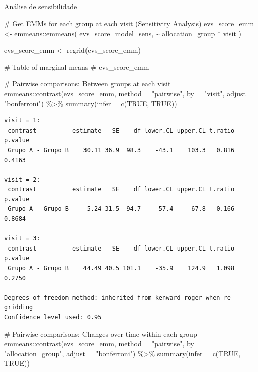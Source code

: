 \documentclass[
  12pt,
]{article}
\makeatletter
\let\oldsubparagraph\subparagraph
\renewcommand{\subparagraph}{
    \@ifstar
      \xxxSubParagraphStar
      \xxxSubParagraphNoStar
  }
\newcommand{\xxxSubParagraphStar}[1]{\oldsubparagraph*{#1}\mbox{}}
\newcommand{\xxxSubParagraphNoStar}[1]{\oldsubparagraph{#1}\mbox{}}
\newenvironment{Shaded}{\begin{snugshade}}{\end{snugshade}}
\newcommand{\AttributeTok}[1]{\textcolor[rgb]{0.40,0.45,0.13}{#1}}
\newcommand{\CommentTok}[1]{\textcolor[rgb]{0.37,0.37,0.37}{#1}}
\newcommand{\ConstantTok}[1]{\textcolor[rgb]{0.56,0.35,0.01}{#1}}
\newcommand{\FunctionTok}[1]{\textcolor[rgb]{0.28,0.35,0.67}{#1}}
\newcommand{\NormalTok}[1]{\textcolor[rgb]{0.00,0.23,0.31}{#1}}
\newcommand{\OtherTok}[1]{\textcolor[rgb]{0.00,0.23,0.31}{#1}}
\newcommand{\SpecialCharTok}[1]{\textcolor[rgb]{0.37,0.37,0.37}{#1}}
\newcommand{\StringTok}[1]{\textcolor[rgb]{0.13,0.47,0.30}{#1}}
\makeatother
\begin{document}
\subparagraph{Análise de
sensibilidade}\label{anuxe1lise-de-sensibilidade-16}

\begin{Shaded}
\begin{Highlighting}[]
\CommentTok{\# Get EMMs for each group at each visit (Sensitivity Analysis)}
\NormalTok{evs\_score\_emm }\OtherTok{\textless{}{-}}\NormalTok{ emmeans}\SpecialCharTok{::}\FunctionTok{emmeans}\NormalTok{(}
\NormalTok{    evs\_score\_model\_sens, }
    \SpecialCharTok{\textasciitilde{}}\NormalTok{ allocation\_group }\SpecialCharTok{*}\NormalTok{ visit}
\NormalTok{)}

\NormalTok{evs\_score\_emm }\OtherTok{\textless{}{-}} \FunctionTok{regrid}\NormalTok{(evs\_score\_emm)}

\CommentTok{\# Table of marginal means}
\CommentTok{\# evs\_score\_emm}

\CommentTok{\# Pairwise comparisons: Between groups at each visit}
\NormalTok{emmeans}\SpecialCharTok{::}\FunctionTok{contrast}\NormalTok{(evs\_score\_emm,}
\AttributeTok{method =} \StringTok{"pairwise"}\NormalTok{, }\AttributeTok{by =} \StringTok{"visit"}\NormalTok{,}
\AttributeTok{adjust =} \StringTok{"bonferroni"}\NormalTok{) }\SpecialCharTok{\%\textgreater{}\%} \FunctionTok{summary}\NormalTok{(}\AttributeTok{infer =} \FunctionTok{c}\NormalTok{(}\ConstantTok{TRUE}\NormalTok{, }\ConstantTok{TRUE}\NormalTok{))}
\end{Highlighting}
\end{Shaded}

\begin{verbatim}
visit = 1:
 contrast          estimate   SE    df lower.CL upper.CL t.ratio p.value
 Grupo A - Grupo B    30.11 36.9  98.3    -43.1    103.3   0.816  0.4163

visit = 2:
 contrast          estimate   SE    df lower.CL upper.CL t.ratio p.value
 Grupo A - Grupo B     5.24 31.5  94.7    -57.4     67.8   0.166  0.8684

visit = 3:
 contrast          estimate   SE    df lower.CL upper.CL t.ratio p.value
 Grupo A - Grupo B    44.49 40.5 101.1    -35.9    124.9   1.098  0.2750

Degrees-of-freedom method: inherited from kenward-roger when re-gridding 
Confidence level used: 0.95 
\end{verbatim}

\begin{Shaded}
\begin{Highlighting}[]
\CommentTok{\# Pairwise comparisons: Changes over time within each group}
\NormalTok{emmeans}\SpecialCharTok{::}\FunctionTok{contrast}\NormalTok{(evs\_score\_emm,}
\AttributeTok{method =} \StringTok{"pairwise"}\NormalTok{, }\AttributeTok{by =} \StringTok{"allocation\_group"}\NormalTok{,}
\AttributeTok{adjust =} \StringTok{"bonferroni"}\NormalTok{) }\SpecialCharTok{\%\textgreater{}\%} \FunctionTok{summary}\NormalTok{(}\AttributeTok{infer =} \FunctionTok{c}\NormalTok{(}\ConstantTok{TRUE}\NormalTok{, }\ConstantTok{TRUE}\NormalTok{))}
\end{Highlighting}
\end{Shaded}
\end{document}
